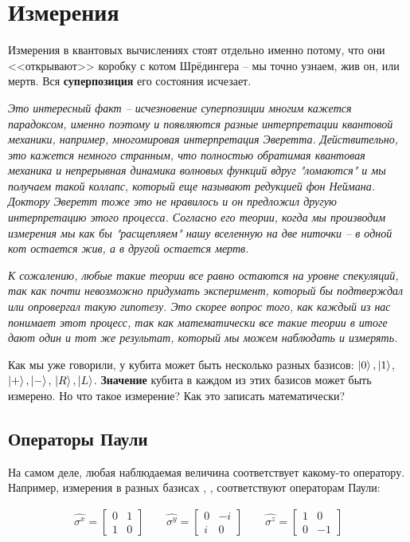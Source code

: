 \documentclass[11pt]{article}
\begin{document}
\section{Измерения}
\label{sec:orga46289e}
Измерения в квантовых вычислениях стоят отдельно именно потому, что они {}<<открывают>>{} коробку с котом Шрёдингера -- мы точно узнаем, жив он, или мертв. Вся \textbf{суперпозиция} его состояния исчезает.



\textit{Это интересный факт -- исчезновение суперпозиции многим кажется парадоксом, именно поэтому и появляются разные интерпретации квантовой механики, например, многомировая интерпретация Эверетта. Действительно, это кажется немного странным, что полностью обратимая квантовая механика и непрерывная динамика волновых функций вдруг "ломаются" и мы получаем такой коллапс, который еще называют редукцией фон Неймана. Доктору Эверетт тоже это не нравилось и он предложил другую интерпретацию этого процесса. Согласно его теории, когда мы производим измерения мы как бы "расщепляем" нашу вселенную на две ниточки -- в одной кот остается жив, а в другой остается мертв.}

\textit{К сожалению, любые такие теории все равно остаются на уровне спекуляций, так как почти невозможно придумать эксперимент, который бы подтверждал или опровергал такую гипотезу. Это скорее вопрос того, как каждый из нас понимает этот процесс, так как математически все такие теории в итоге дают один и тот же результат, который мы можем наблюдать и измерять.}


Как мы уже говорили, у кубита может быть несколько разных базисов: \(\ket{0}, \ket{1}\), \(\ket{+}, \ket{-}\), \(\ket{R}, \ket{L}\). \textbf{Значение} кубита в каждом из этих базисов может быть измерено. Но что такое измерение? Как это записать математически?

\subsection{Операторы Паули}
\label{sec:org6ece396}
На самом деле, любая наблюдаемая величина соответствует какому-то оператору. Например, измерения в разных базисах , ,  соответствуют операторам Паули:

\begin{align*}
\hat{\sigma^x} = \begin{bmatrix}0 & 1\\1 & 0\end{bmatrix}\qquad\hat{\sigma^y} = \begin{bmatrix}0 & -i\\i & 0\end{bmatrix}\qquad\hat{\sigma^z} = \begin{bmatrix}1 & 0\\0 & -1\end{bmatrix}
\end{align*}
\end{document}
